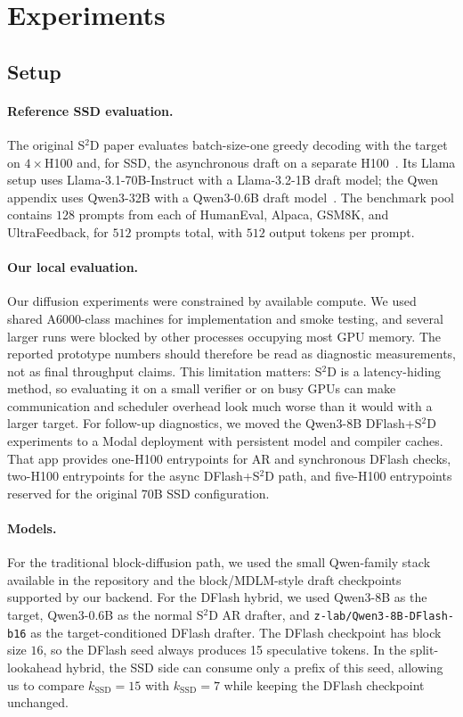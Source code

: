 \section{Experiments}
\label{sec:experiments}

\subsection{Setup}

\paragraph{Reference SSD evaluation.}
The original S$^2$D paper evaluates batch-size-one greedy decoding with the
target on $4\times$H100 and, for SSD, the asynchronous draft on a separate
H100~\cite{saguaro2024}. Its Llama setup uses Llama-3.1-70B-Instruct with a
Llama-3.2-1B draft model; the Qwen appendix uses Qwen3-32B with a Qwen3-0.6B
draft model~\cite{yang2025qwen3}. The benchmark pool contains $128$ prompts
from each of HumanEval, Alpaca, GSM8K, and UltraFeedback, for $512$ prompts
total, with $512$ output tokens per prompt.

\paragraph{Our local evaluation.}
Our diffusion experiments were constrained by available compute. We used
shared A6000-class machines for implementation and smoke testing, and several
larger runs were blocked by other processes occupying most GPU memory. The
reported prototype numbers should therefore be read as diagnostic
measurements, not as final throughput claims. This limitation matters:
S$^2$D is a latency-hiding method, so evaluating it on a small verifier or on
busy GPUs can make communication and scheduler overhead look much worse than
it would with a larger target. For follow-up diagnostics, we moved the
Qwen3-8B DFlash+S$^2$D experiments to a Modal deployment with persistent model
and compiler caches. That app provides one-H100 entrypoints for AR and
synchronous DFlash checks, two-H100 entrypoints for the async DFlash+S$^2$D
path, and five-H100 entrypoints reserved for the original 70B SSD
configuration.

\paragraph{Models.}
For the traditional block-diffusion path, we used the small Qwen-family stack
available in the repository and the block/MDLM-style draft checkpoints
supported by our backend. For the DFlash hybrid, we used Qwen3-8B as the
target, Qwen3-0.6B as the normal S$^2$D AR drafter, and
\texttt{z-lab/Qwen3-8B-DFlash-b16} as the target-conditioned DFlash drafter.
The DFlash checkpoint has block size $16$, so the DFlash seed always produces
15 speculative tokens. In the split-lookahead hybrid, the SSD side can consume
only a prefix of this seed, allowing us to compare $k_{\mathrm{SSD}}=15$ with
$k_{\mathrm{SSD}}=7$ while keeping the DFlash checkpoint unchanged.

